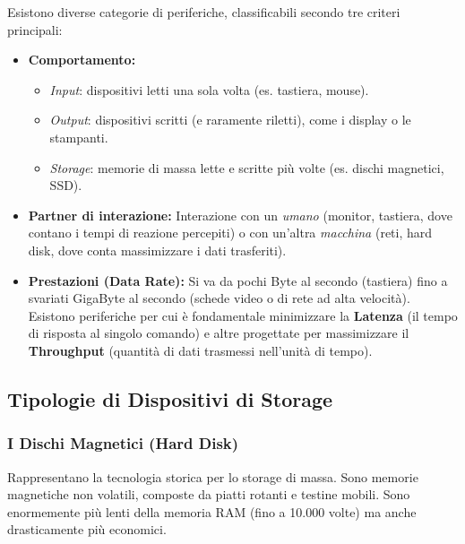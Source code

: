 \documentclass[12pt, a4paper]{article}
\begin{document}
Esistono diverse categorie di periferiche, classificabili secondo tre criteri principali:
\begin{itemize}
    \item \textbf{Comportamento:} 
    \begin{itemize}
        \item \textit{Input}: dispositivi letti una sola volta (es. tastiera, mouse).
        \item \textit{Output}: dispositivi scritti (e raramente riletti), come i display o le stampanti.
        \item \textit{Storage}: memorie di massa lette e scritte più volte (es. dischi magnetici, SSD).
    \end{itemize}
    \item \textbf{Partner di interazione:} Interazione con un \textit{umano} (monitor, tastiera, dove contano i tempi di reazione percepiti) o con un'altra \textit{macchina} (reti, hard disk, dove conta massimizzare i dati trasferiti).
    \item \textbf{Prestazioni (Data Rate):} Si va da pochi Byte al secondo (tastiera) fino a svariati GigaByte al secondo (schede video o di rete ad alta velocità). Esistono periferiche per cui è fondamentale minimizzare la \textbf{Latenza} (il tempo di risposta al singolo comando) e altre progettate per massimizzare il \textbf{Throughput} (quantità di dati trasmessi nell'unità di tempo).
\end{itemize}

\newpage

\subsection{Tipologie di Dispositivi di Storage}

\subsubsection{I Dischi Magnetici (Hard Disk)}
Rappresentano la tecnologia storica per lo storage di massa. Sono memorie magnetiche non volatili, composte da piatti rotanti e testine mobili. Sono enormemente più lenti della memoria RAM (fino a 10.000 volte) ma anche drasticamente più economici.
\end{document}
